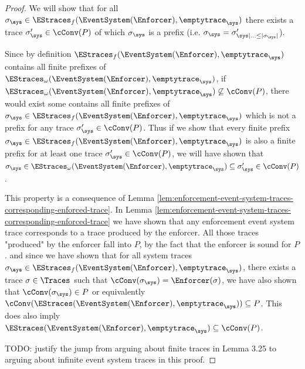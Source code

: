 \begin{proof}
    \label{proof:theorem-induced-enforcement-event-system-soundness}
    We will show that for all
    $\sigma_\sys \in \EStraces_f(\EventSystem(\Enforcer), \emptytrace_\sys)$
    there exists a trace $\sigma_\sys' \in \cConv(P)$
    of which $\sigma_\sys$ is a prefix
    (i.e. $\sigma_\sys = \sigma'_{\sys \mid \ldots \leq |\sigma_\sys|}$).

    Since by definition
    $\EStraces_f(\EventSystem(\Enforcer), \emptytrace_\sys)$
    contains all finite prefixes of
    $\EStraces_\omega(\EventSystem(\Enforcer), \emptytrace_\sys)$,
    if
    $\EStraces_\omega(\EventSystem(\Enforcer), \emptytrace_\sys)
    \not\subseteq \cConv(P)$,
    there would exist some
    contains all finite prefixes of
    $\sigma_\sys \in \EStraces_f(\EventSystem(\Enforcer), \emptytrace_\sys)$
    which is not a prefix for any trace $\sigma_\sys' \in \cConv(P)$.
    Thus if we show that every finite prefix 
    $\sigma_\sys \in \EStraces_f(\EventSystem(\Enforcer), \emptytrace_\sys)$
    is also a finite prefix for at least one trace  $\sigma_\sys' \in \cConv(P)$,
    we will have shown that
    $\sigma_\sys \in \EStraces_\omega(\EventSystem(\Enforcer), \emptytrace_\sys)
    \subseteq \sigma_\sys' \in \cConv(P)$.

    This property is a consequence of Lemma
    \ref{lem:enforcement-event-system-traces-corresponding-enforced-trace}.
    In Lemma
    \ref{lem:enforcement-event-system-traces-corresponding-enforced-trace}
    we have shown that any enforcement event system trace
    corresponds to a trace produced by the enforcer.
    All those traces "produced" by the enforcer fall into $P$,
    by the fact that the enforcer is sound for $P$.
    and since we have shown that for all system traces
    $\sigma_\sys \in \EStraces_f(\EventSystem(\Enforcer), \emptytrace_\sys)$,
    there exists a trace $\sigma \in \Traces$
    such that $\cConv(\sigma_\sys) = \Enforcer(\sigma)$, we have
    also shown that $\cConv(\sigma_\sys) \in P$ or equivalently
    $\cConv(\EStraces(\EventSystem(\Enforcer), \emptytrace_\sys)) \subseteq P$.
    This does also imply 
    $\EStraces(\EventSystem(\Enforcer), \emptytrace_\sys) \subseteq \cConv(P)$.

    TODO: justify the jump from arguing about finite traces in Lemma 3.25
    to arguing about infinite event system traces in this proof.



\end{proof}
